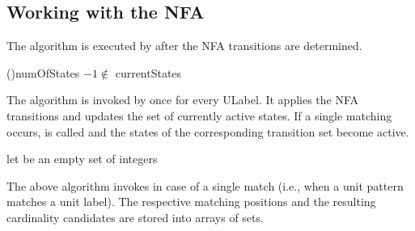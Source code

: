 \subsection{Working with the NFA}
The algorithm  is executed by  after the NFA transitions are determined.

\begin{algorithm}[H]
  \caption{\label{alg:match}}
    \lIf(){numOfStates $-1\not\in$ currentStates}{\Return {}}
    \Return {}\;
\end{algorithm}

The algorithm  is invoked by  once for every ULabel. It applies the NFA transitions and updates the set of currently active states. If a single matching occurs,  is called and the states of the corresponding transition set become active.

\begin{algorithm}
  \caption{\label{alg:updateStates}}
    let  be an empty set of integers\;
    \;
\end{algorithm}

The above algorithm invokes  in case of a single match (i.e., when a unit pattern matches a unit label). The respective matching positions and the resulting cardinality candidates are stored into arrays of sets.

